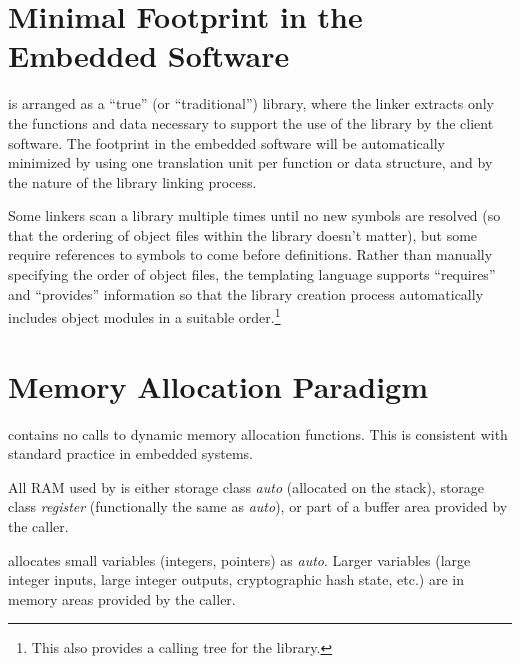 \section{Minimal Footprint in the Embedded Software}
\label{cldd0:smfe0}

\emph{\productbasenameshort{}} is arranged as a ``true'' (or 
``traditional'') library, where the linker extracts only the 
functions and data necessary to support the use of the 
library by the client software.  The 
\emph{\productbasenameshort{}} footprint in the embedded 
software will be automatically minimized by using one 
translation unit per function or data structure, and by the 
nature of the library linking process.  

Some linkers scan a library multiple times until no new 
symbols are resolved (so that the ordering of object files 
within the library doesn't matter), but some require 
references to symbols to come before definitions.  Rather 
than manually specifying the order of object files, the 
templating language supports ``requires'' and ``provides'' 
information so that the library creation process 
automatically includes object modules in a suitable 
order.\footnote{This also provides a calling tree for the 
library.} 


\section{Memory Allocation Paradigm}
\label{cldd0:smap0}

\emph{\productbasenameshort{}} contains no calls to dynamic 
memory allocation functions.  This is consistent with 
standard practice in embedded systems.  

All RAM used by \emph{\productbasenameshort{}} is either 
storage class \emph{auto} (allocated on the stack), storage 
class \emph{register} (functionally the same as 
\emph{auto}), or part of a buffer area provided by the 
caller.  

\emph{\productbasenameshort{}} allocates small variables 
(integers, pointers) as \emph{auto}\@.  Larger variables 
(large integer inputs, large integer outputs, cryptographic 
hash state, etc.) are in memory areas provided by the 
caller.  

